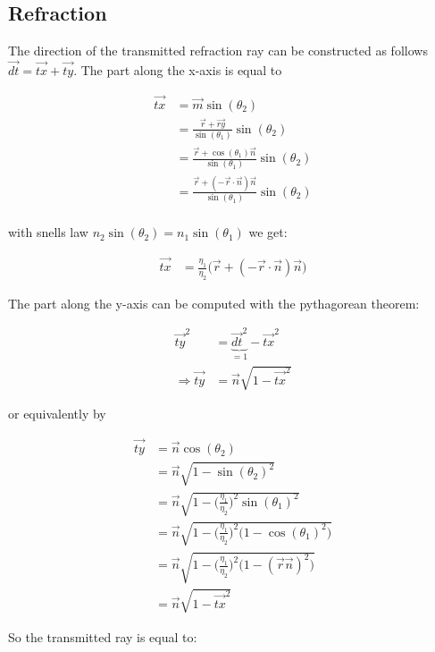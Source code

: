 \documentclass[11pt,a4paper,oneside]{article}
\begin{document}
\subsection{Refraction}

The direction of the transmitted refraction ray can be constructed as follows $\vec{dt} = \vec{tx} + \vec{ty}$.\cite{de2006reflections} The part along the x-axis is equal to

\begin{align}
\vec{tx} &= \vec{m} \sin(\theta_2) \\
&= \frac{\vec{r} + \vec{ry}}{\sin(\theta_1)} \sin(\theta_2) \\
&= \frac{\vec{r} + \cos(\theta_1) \vec{n}}{\sin(\theta_1)} \sin(\theta_2) \\
&= \frac{\vec{r} + (-\vec{r} \cdot \vec{n}) \vec{n}}{\sin(\theta_1)} \sin(\theta_2) \\
\end{align}

with snells law $n_2 \sin(\theta_2) = n_1 \sin(\theta_1)$ we get:

\begin{align}
\vec{tx} &= \frac{\eta_1}{\eta_2} \big( \vec{r} + (-\vec{r} \cdot \vec{n}) \vec{n} \big)
\end{align}

The part along the y-axis can be computed with the pythagorean theorem:

\begin{align}
\vec{ty}^2 &= \underbrace{ \vec{dt}^2 }_{=1} - \vec{tx}^2 \\
\Rightarrow \vec{ty} &= \vec{n} \sqrt{1 - \vec{tx}^2}
\end{align}

or equivalently by

\begin{align}
\vec{ty} &= \vec{n} \cos(\theta_2) \\
&= \vec{n} \sqrt{1 - \sin(\theta_2)^2} \\
&= \vec{n} \sqrt{1 - \Bigg( \frac{\eta_1}{\eta_2} \Bigg)^2 \sin(\theta_1)^2} \\
&= \vec{n} \sqrt{1 - \Bigg( \frac{\eta_1}{\eta_2} \Bigg)^2 \big(1 - \cos(\theta_1)^2 \big)} \\
&= \vec{n} \sqrt{1 - \Bigg( \frac{\eta_1}{\eta_2} \Bigg)^2 \big(1 - ( \vec{r} \vec{n} )^2 \big)} \\
&= \vec{n} \sqrt{1 - \vec{tx}^2}
\end{align}

So the transmitted ray is equal to:
\end{document}

